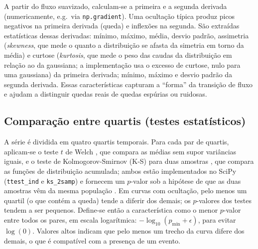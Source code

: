 A partir do fluxo suavizado, calculam-se a primeira e a segunda derivada (numericamente, e.g.\ via \texttt{np.gradient}). Uma ocultação típica produz picos negativos na primeira derivada (queda) e inflexões na segunda. São extraídas estatísticas dessas derivadas: mínimo, máximo, média, desvio padrão, assimetria (\textit{skewness}, que mede o quanto a distribuição se afasta da simetria em torno da média) e curtose (\textit{kurtosis}, que mede o peso das caudas da distribuição em relação ao da gaussiana; a implementação usa o excesso de curtose, nulo para uma gaussiana) da primeira derivada; mínimo, máximo e desvio padrão da segunda derivada. Essas características capturam a ``forma'' da transição de fluxo e ajudam a distinguir quedas reais de quedas espúrias ou ruidosas.

\subsection{Comparação entre quartis (testes estatísticos)}
\label{sec:quartis}

A série é dividida em quatro quartis temporais. Para cada par de quartis, aplicam-se o teste \(t\) de Welch \citep{Welch1947}, que compara as médias sem supor variâncias iguais, e o teste de Kolmogorov-Smirnov (K-S) para duas amostras \citep{Kolmogorov1933, Smirnov1948}, que compara as funções de distribuição acumulada; ambos estão implementados no SciPy (\texttt{ttest\_ind} e \texttt{ks\_2samp}) \citep{SciPy2020} e fornecem um \(p\)-valor sob a hipótese de que as duas amostras vêm da mesma população \citep{Wall2003, Morettin2010}. Em curvas com ocultação, pelo menos um quartil (o que contém a queda) tende a diferir dos demais; os \(p\)-valores dos testes tendem a ser pequenos. Define-se então a característica como o menor \(p\)-valor entre todos os pares, em escala logarítmica: \(-\log_{10}(p_{\min} + \epsilon)\), para evitar \(\log(0)\). Valores altos indicam que pelo menos um trecho da curva difere dos demais, o que é compatível com a presença de um evento.

